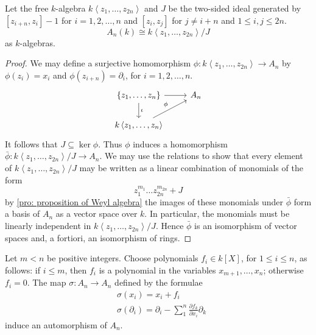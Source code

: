 \documentclass[12pt, oneside]{book}
\begin{document}
\begin{theorem}
    Let the free $k$-algebra $k\left\langle z_1, \ldots, z_{2 n} \right\rangle$ and $J$ be the two-sided ideal generated by $\left[z_{i+n}, z_i\right]-1$ for $i=1,2, \ldots, n$ and $\left[z_i, z_j\right]$ for $j \neq i+n$ and $1 \leq i, j \leq 2 n$.
    \begin{equation*}
        A_n(k)\cong k\left\langle z_1, \ldots, z_{2 n}\right\rangle / J
    \end{equation*}
    as $k$-algebras.
    \begin{proof}
        We may define a surjective homomorphism $\phi: k\left\langle z_1, \ldots, z_{2 n}\right\rangle \rightarrow A_n$ by $\phi\left(z_i\right)=x_i$ and $\phi\left(z_{i+n}\right)=\partial_i$, for $i=1,2, \ldots, n$.
        \begin{equation*}
            \begin{tikzcd}
                \left\{z_1,\ldots,z_n\right\} \arrow[r,""]\arrow[d,"\iota"]& A_n \\
                k\left\langle z_1,\ldots,z_n\right\rangle \arrow[ru,"\phi"]&
            \end{tikzcd}
        \end{equation*}
        It follows that $J \subseteq \operatorname{ker} \phi$. Thus $\phi$ induces a homomorphism $\bar{\phi}: k\left\langle z_1, \ldots, z_{2 n}\right\rangle / J \longrightarrow A_n$.
        We may use the relations to show that every element of $k\left\langle z_1, \ldots, z_{2 n}\right\rangle / J$ may be written as a linear combination of monomials of the form
        \begin{equation*}
            z_1^{m_1} \ldots z_{2 n}^{m_{2 n}}+J
        \end{equation*}
        by \ref{pro: proposition of Weyl algebra} the images of these monomials under $\bar{\phi}$ form a basis of $A_n$ as a vector space over $k$. In particular, the monomials must be linearly independent in $k\left\langle z_1, \ldots, z_{2 n}\right\rangle / J$. Hence $\bar{\phi}$ is an isomorphism of vector spaces and, a fortiori, an isomorphism of rings.
    \end{proof}
\end{theorem}





\begin{corollary}
    Let $m<n$ be positive integers. Choose polynomials $f_i \in k[X]$, for $1 \leq i \leq n$, as follows: if $i \leq m$, then $f_i$ is a polynomial in the variables $x_{m+1}, \ldots, x_n$; otherwise $f_i=0$.
    The map $\sigma: A_n \longrightarrow A_n$ defined by the formulae
    \begin{equation*}
        \begin{aligned}
             & \sigma\left(x_i\right)=x_i+f_i                                                                 \\
             & \sigma\left(\partial_i\right)=\partial_i-\sum_1^n \frac{\partial f_k}{\partial x_i} \partial_k
        \end{aligned}
    \end{equation*}
    induce an automorphism of $A_n$.
\end{corollary}
\end{document}
